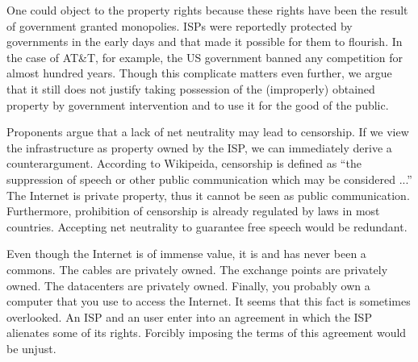 One could object to the property rights because these rights have been the result of government granted monopolies. \acp{ISP} were reportedly protected by governments in the early days and that made it possible for them to flourish. In the case of AT\&T, for example, the US government banned any competition for almost hundred years. \cite{oa2014objectivists} Though this complicate matters even further, we argue that it still does not justify taking possession of the (improperly) obtained property by government intervention and to use it for the good of the public.

Proponents argue that a lack of net neutrality may lead to censorship. If we view the infrastructure as property owned by the \ac{ISP}, we can immediately derive a counterargument. According to Wikipeida, censorship is defined as ``the suppression of speech or other public communication which may be considered ...'' The Internet is private property, thus it cannot be seen as public communication. \cite{falkvinge2014agree} Furthermore, prohibition of censorship is already regulated by laws in most countries. Accepting net neutrality to guarantee free speech would be redundant.




Even though the Internet is of immense value, it is and has never been a commons. The cables are privately owned. The exchange points are privately owned. The datacenters are privately owned. Finally, you probably own a computer that you use to access the Internet. It seems that this fact is sometimes overlooked. An \ac{ISP} and an user enter into an agreement in which the \ac{ISP} alienates some of its rights. Forcibly imposing the terms of this agreement would be unjust. \cite{tech2014deon}